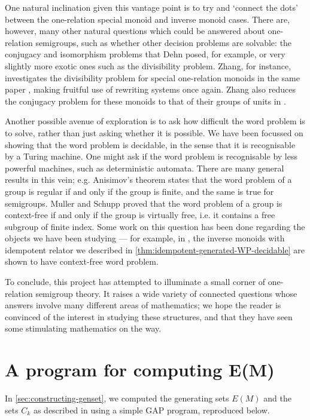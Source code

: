 \documentclass[noindex,noinsetproof,emphthm,12pt]{lmaths}
\begin{document}
One natural inclination given this vantage point is to try and `connect the dots' between the one-relation special monoid and inverse monoid cases. There are, however, many other natural questions which could be answered about one-relation semigroups, such as whether other decision problems are solvable: the conjugacy and isomorphism problems that Dehn posed, for example, or very slightly more exotic ones such as the divisibility problem. Zhang, for instance, investigates the divisibility problem for special one-relation monoids in the same paper \cite{Zhang1992a}, making fruitful use of rewriting systems once again. Zhang also reduces the conjugacy problem for these monoids to that of their groups of units in \cite{Zhang1991}.

Another possible avenue of exploration is to ask how difficult the word problem is to solve, rather than just asking whether it is possible. We have been focussed on showing that the word problem is decidable, in the sense that it is recognisable by a Turing machine. One might ask if the word problem is recognisable by less powerful machines, such as deterministic automata. There are many general results in this vein; e.g. Anisimov's theorem states that the word problem of a group is regular if and only if the group is finite, and the same is true for semigroups. Muller and Schupp proved that the word problem of a group is context-free if and only if the group is virtually free, i.e. it contains a free subgroup of finite index. Some work on this question has been done regarding the objects we have been studying --- for example, in \cite{Margolis1993}, the inverse monoids with idempotent relator we described in \cref{thm:idempotent-generated-WP-decidable} are shown to have context-free word problem.

To conclude, this project has attempted to illuminate a small corner of one-relation semigroup theory. It raises a wide variety of connected questions whose answers involve many different areas of mathematics; we hope the reader is convinced of the interest in studying these structures, and that they have seen some stimulating mathematics on the way.


\appendix
\section{A program for computing \texorpdfstring{E(M)}{$E(M)$}} \label{sec:E(M)-program}

In \cref{sec:constructing-genset}, we computed the generating sets $E(M)$ and the sets $C_k$ as described in \cite{Zhang1992a} using a simple GAP program, reproduced below.

\inputminted[linenos=true,mathescape,tabsize=2,breaklines]{gap}{../ors.g}
\clearpage

\printbibliography

\printindex
\end{document}

